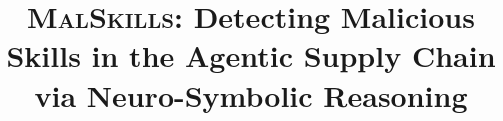\documentclass[sigconf,screen,review,anonymous]{acmart}
\newcommand{\toolname}{\textsc{MalSkills}\xspace}
\begin{document}
\title{\toolname: Detecting Malicious Skills in the Agentic Supply Chain via Neuro-Symbolic Reasoning}



\maketitle












\end{document}
